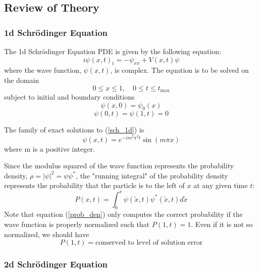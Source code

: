 \documentclass[10pt]{article}
\begin{document}
\subsection*{Review of Theory}

\subsubsection*{1d Schrödinger Equation}

The 1d Schrödinger Equation PDE is given by the following equation:
\begin{equation}\label{sch_1d}
i\psi(x,t)_t = -\psi_{xx} + V(x,t)\psi
\end{equation}
where the wave function, $\psi(x,t)$, is complex. The equation is to be solved on the domain
$$0\leq x \leq 1, \quad 0 \leq t \leq t_{\textrm{max}}$$
subject to initial and boundary conditions
\begin{equation}\label{sch_1d_IC}
\psi(x,0) = \psi_0(x)
\end{equation}
\begin{equation}\label{sch_1d_BC}
\psi(0,t) = \psi(1,t) = 0
\end{equation}

The family of exact solutions to (\ref{sch_1d}) is
\begin{equation}\label{1d_exact_soln}
\psi(x,t) = e^{-i m^2 \pi^2 t} \sin(m \pi x)
\end{equation}
where m is a positive integer. 

Since the modulus squared of the wave function represents the probability density, 
$\rho = |\psi|^2 = \psi \psi^*$, the "running integral" of the probability density represents
the probability that the particle is to the left of $x$ at any given time $t$:
\begin{equation}\label{prob_den}
P(x,t) = \int_0^x \psi(\tilde{x}, t) \psi^*(\tilde{x}, t) d\tilde{x}
\end{equation}
Note that equation (\ref{prob_den}) only computes the correct probability if the wave function 
is properly normalized such that $P(1,t) = 1$. Even if it is not so normalized, we should have
$$P(1,t) = \textrm{conserved to level of solution error}$$

\subsubsection*{2d Schrödinger Equation}
\end{document}
